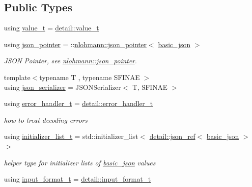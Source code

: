 \subsection*{Public Types}
\begin{DoxyCompactItemize}
\item 
using \hyperlink{classnlohmann_1_1basic__json_ae8cbef097f7da18a781fc86587de6b90}{value\+\_\+t} = \hyperlink{namespacenlohmann_1_1detail_a1ed8fc6239da25abcaf681d30ace4985}{detail\+::value\+\_\+t}
\item 
using \hyperlink{classnlohmann_1_1basic__json_a6886a5001f5b449ad316101a311ce536}{json\+\_\+pointer} = \+::\hyperlink{classnlohmann_1_1json__pointer}{nlohmann\+::json\+\_\+pointer}$<$ \hyperlink{classnlohmann_1_1basic__json}{basic\+\_\+json} $>$
\begin{DoxyCompactList}\small\item\em J\+S\+ON Pointer, see \hyperlink{classnlohmann_1_1json__pointer}{nlohmann\+::json\+\_\+pointer}. \end{DoxyCompactList}\item 
{\footnotesize template$<$typename T , typename S\+F\+I\+N\+AE $>$ }\\using \hyperlink{classnlohmann_1_1basic__json_a7768841baaaa7a21098a401c932efaff}{json\+\_\+serializer} = J\+S\+O\+N\+Serializer$<$ T, S\+F\+I\+N\+AE $>$
\item 
using \hyperlink{classnlohmann_1_1basic__json_ae56b6bfbb1f6d2f43611f2ada4f9e5f2}{error\+\_\+handler\+\_\+t} = \hyperlink{namespacenlohmann_1_1detail_a5a76b60b26dc8c47256a996d18d967df}{detail\+::error\+\_\+handler\+\_\+t}
\begin{DoxyCompactList}\small\item\em how to treat decoding errors \end{DoxyCompactList}\item 
using \hyperlink{classnlohmann_1_1basic__json_a670f6a0eb3d1e0ffd00c27d35472ccc9}{initializer\+\_\+list\+\_\+t} = std\+::initializer\+\_\+list$<$ \hyperlink{classnlohmann_1_1detail_1_1json__ref}{detail\+::json\+\_\+ref}$<$ \hyperlink{classnlohmann_1_1basic__json}{basic\+\_\+json} $>$$>$
\begin{DoxyCompactList}\small\item\em helper type for initializer lists of \hyperlink{classnlohmann_1_1basic__json}{basic\+\_\+json} values \end{DoxyCompactList}\item 
using \hyperlink{classnlohmann_1_1basic__json_a2ddbac818a4c84a7377b1bbd25363588}{input\+\_\+format\+\_\+t} = \hyperlink{namespacenlohmann_1_1detail_aa554fc6a11519e4f347deb25a9f0db40}{detail\+::input\+\_\+format\+\_\+t}
$$
\end{DoxyCompactItemize}
